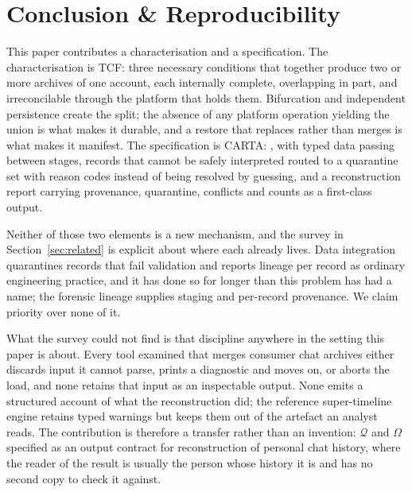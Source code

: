 
\section{Conclusion \& Reproducibility}
\label{sec:conclusion}

This paper contributes a characterisation and a specification. The
characterisation is TCF: three necessary conditions that together produce two or
more archives of one account, each internally complete, overlapping in part, and
irreconcilable through the platform that holds them. Bifurcation and
independent persistence create the split; the absence of any platform
operation yielding the union is what makes it durable, and a restore that
replaces rather than merges is what makes it manifest. The specification is
CARTA: \carta, with typed data passing between stages, records that cannot be
safely interpreted routed to a quarantine set with reason codes instead of
being resolved by guessing, and a reconstruction report carrying provenance,
quarantine, conflicts and counts as a first-class output.

Neither of those two elements is a new mechanism, and the survey in
Section~\ref{sec:related} is explicit about where each already lives. Data
integration quarantines records that fail validation and reports lineage per
record as ordinary engineering practice, and it has done so for longer than this
problem has had a name; the forensic lineage supplies staging and per-record
provenance. We claim priority over none of it.

What the survey could not find is that discipline anywhere in the setting this
paper is about. Every tool examined that merges consumer chat archives either
discards input it cannot parse, prints a diagnostic and moves on, or aborts the
load, and none retains that input as an inspectable output. None emits a
structured account of what the reconstruction did; the reference super-timeline
engine retains typed warnings but keeps them out of the artefact an analyst
reads. The contribution is therefore a transfer rather than an invention:
$\mathcal{Q}$ and $\Omega$ specified as an output contract for reconstruction of
personal chat history, where the reader of the result is usually the person whose
history it is and has no second copy to check it against.

